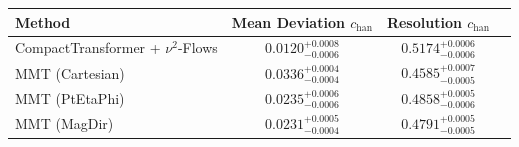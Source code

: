     \begin{tabular}{lccc}
        \toprule
        Method & Mean Deviation $c_{\text{han}}$ & Resolution $c_{\text{han}}$ \\
        \midrule
        CompactTransformer + $\nu^2$-Flows & $0.0120^{+0.0008}_{-0.0006}$ & $0.5174^{+0.0006}_{-0.0006}$ \\
        MMT (Cartesian) & $0.0336^{+0.0004}_{-0.0004}$ & $0.4585^{+0.0007}_{-0.0005}$ \\
        MMT (PtEtaPhi) & $0.0235^{+0.0006}_{-0.0006}$ & $0.4858^{+0.0005}_{-0.0006}$ \\
        MMT (MagDir) & $0.0231^{+0.0005}_{-0.0004}$ & $0.4791^{+0.0005}_{-0.0005}$ \\
        \bottomrule
    \end{tabular}